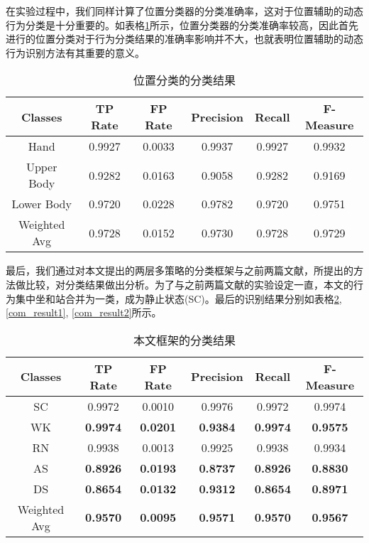 \par 在实验过程中，我们同样计算了位置分类器的分类准确率，这对于位置辅助的动态行为分类是十分重要的。如表格\ref{position_result}所示，位置分类器的分类准确率较高，因此首先进行的位置分类对于行为分类结果的准确率影响并不大，也就表明位置辅助的动态行为识别方法有其重要的意义。

 \begin{table}[!htb]
    \centering
    \caption{位置分类的分类结果}\label{position_result}
    \begin{tabular}{cccccc}
    \toprule
    Classes & TP Rate & FP Rate & Precision & Recall & F-Measure \\
    \midrule
    Hand & 0.9927 & 0.0033 & 0.9937 & 0.9927 & 0.9932\\
    Upper Body & 0.9282 & 0.0163 & 0.9058 & 0.9282 & 0.9169	\\
    Lower Body & 0.9720 & 0.0228 & 0.9782 & 0.9720 & 0.9751	\\
    \hline
    Weighted Avg & 0.9728 & 0.0152 & 0.9730 & 0.9728 & 0.9729\\
    \bottomrule
    \end{tabular}
 \end{table}

\par 最后，我们通过对本文提出的两层多策略的分类框架与之前两篇文献\cite{orientationTransation1}，\cite{bisio2014comparison}所提出的方法做比较，对分类结果做出分析。为了与之前两篇文献的实验设定一直，本文的行为集中坐和站合并为一类，成为静止状态(SC)。最后的识别结果分别如表格\ref{final_result}, \ref{com_result1}, \ref{com_result2}所示。
 \begin{table}[htb]
    \centering
    \caption{本文框架的分类结果}\label{final_result}
    \begin{tabular}{cccccc}
    \toprule
    Classes & TP Rate & FP Rate & Precision & Recall & F-Measure \\
    \midrule
    SC & 0.9972 & 0.0010 & 0.9976 & 0.9972 & 0.9974 \\
    WK & \textbf{0.9974} & \textbf{0.0201} & \textbf{0.9384} & \textbf{0.9974} & \textbf{0.9575}	\\
    RN & 0.9938 & 0.0013 & 0.9925 & 0.9938 & 0.9934	\\
    AS & \textbf{0.8926} & \textbf{0.0193} & \textbf{0.8737} & \textbf{0.8926} & \textbf{0.8830} \\
    DS & \textbf{0.8654} & \textbf{0.0132} & \textbf{0.9312} & \textbf{0.8654} & \textbf{0.8971}	\\
    \hline
    Weighted Avg & \textbf{0.9570} & \textbf{0.0095} & \textbf{0.9571} & \textbf{0.9570} & \textbf{0.9567} \\
    \bottomrule
    \end{tabular}
 \end{table}

